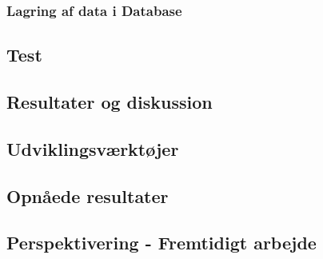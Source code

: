 \subsubsection{Lagring af data i Database}

\subsection{Test}
\subsection{Resultater og diskussion}
\subsection{Udviklingsværktøjer}
\subsection{Opnåede resultater}
\subsection{Perspektivering - Fremtidigt arbejde}